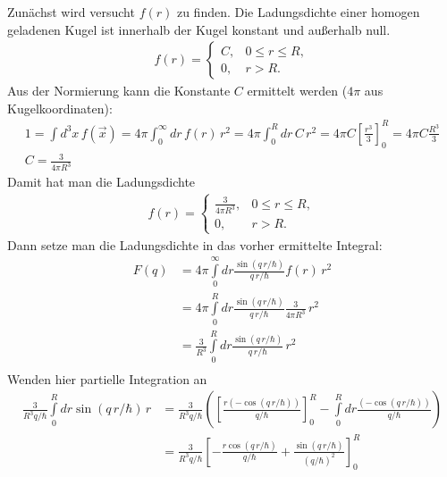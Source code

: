 \documentclass[11pt,a4paper]{scrartcl}
\begin{document}
\begin{enumerate}[start=2, label=(\alph*)]
    
    \begin{tcolorbox}[title=Berechnung, breakable]
        Zunächst wird versucht $f(r)$ zu finden. Die Ladungsdichte einer homogen geladenen Kugel ist innerhalb der Kugel konstant und außerhalb null. 
        \begin{align*}
            f(r) =
            \begin{cases}
                C, & 0 \leq r \leq R, \\
                0, & r > R .
            \end{cases}
        \end{align*}
        Aus der Normierung kann die Konstante $C$ ermittelt werden ($4\pi$ aus Kugelkoordinaten):
        \begin{align*}
            1 = \int d^3x\, f(\vec{x}) = 4\pi \int_0^{\infty} dr\, f(r)\, r^2 = 4\pi \int_0^R dr\, C\, r^2 = 4\pi C\left[\frac{r^3}{3}\right]_0^R = 4\pi C\frac{R^3}{3}\\
            C = \frac{3}{4\pi R^3}
        \end{align*}
        Damit hat man die Ladungsdichte
        \begin{align*}
            f(r) =
            \begin{cases}
                \frac{3}{4\pi R^3}, & 0 \leq r \leq R, \\
                0, & r > R .
            \end{cases}
        \end{align*}
        Dann setze man die Ladungsdichte in das vorher ermittelte Integral:
        \begin{align*}
            F(q) &= 4 \pi \int\limits_0^\infty dr \frac{\sin(q \, r/\hbar)}{q \, r/\hbar} f(r) \, r^2 \\
            &= 4 \pi \int\limits_0^R dr \frac{\sin(q \, r/\hbar)}{q \, r/\hbar} \frac{3}{4\pi R^3} \, r^2\\
            &= \frac{3}{R^3} \int\limits_0^R dr \frac{\sin(q \, r/\hbar)}{q \, r/\hbar}  \, r^2\\
        \end{align*}
        Wenden hier partielle Integration an
        \begin{align*}
            \frac{3}{R^3 q/\hbar} \int\limits_0^R dr \sin(q \, r/\hbar)  \, r &= \frac{3}{R^3 q /\hbar}  \left(\left[\frac{r(-\cos(q\,r/\hbar))}{q/\hbar}\right]_0^R - \int\limits_0^R dr \frac{(-\cos(q\,r/\hbar))}{q/\hbar}\right)\\
            &= \frac{3}{R^3 q /\hbar}  \left[-\frac{r\cos(q\,r/\hbar)}{q/\hbar} + \frac{\sin(q\,r/\hbar)}{(q/\hbar)^2}\right]_0^R\\

\end{align*}
\end{tcolorbox}
\end{enumerate}
\end{document}
